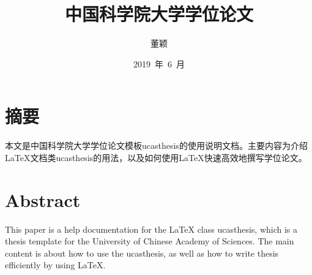 \confidential{}%
\title{中国科学院大学学位论文}%
\author{董颖}%


\date{2019~年~6~月}%
\maketitle%
\MAKETITLE%
\makedeclaration%
\chapter*{摘\quad 要}%
\setcounter{page}{1}%

本文是中国科学院大学学位论文模板ucasthesis的使用说明文档。主要内容为介绍\LaTeX{}文档类ucasthesis的用法，以及如何使用\LaTeX{}快速高效地撰写学位论文。

\chapter*{Abstract}%

This paper is a help documentation for the \LaTeX{} class ucasthesis, which is  a thesis template for the University of Chinese Academy of Sciences. The main content is about how to use the ucasthesis, as well as how to write thesis efficiently by using \LaTeX{}.

